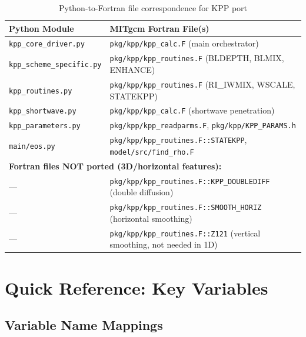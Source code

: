 \documentclass[11pt]{article}
\begin{document}
\begin{table}[h]
\centering
\small
\begin{tabular}{lp{6cm}}
\toprule
\textbf{Python Module} & \textbf{MITgcm Fortran File(s)} \\
\midrule
\verb|kpp_core_driver.py| & \verb|pkg/kpp/kpp_calc.F| (main orchestrator) \\
\verb|kpp_scheme_specific.py| & \verb|pkg/kpp/kpp_routines.F| (BLDEPTH, BLMIX, ENHANCE) \\
\verb|kpp_routines.py| & \verb|pkg/kpp/kpp_routines.F| (RI\_IWMIX, WSCALE, STATEKPP) \\
\verb|kpp_shortwave.py| & \verb|pkg/kpp/kpp_calc.F| (shortwave penetration) \\
\verb|kpp_parameters.py| & \verb|pkg/kpp/kpp_readparms.F|, \verb|pkg/kpp/KPP_PARAMS.h| \\
\verb|main/eos.py| & \verb|pkg/kpp/kpp_routines.F::STATEKPP|, \verb|model/src/find_rho.F| \\
\midrule
\multicolumn{2}{l}{\textbf{Fortran files NOT ported (3D/horizontal features):}} \\
— & \verb|pkg/kpp/kpp_routines.F::KPP_DOUBLEDIFF| (double diffusion) \\
— & \verb|pkg/kpp/kpp_routines.F::SMOOTH_HORIZ| (horizontal smoothing) \\
— & \verb|pkg/kpp/kpp_routines.F::Z121| (vertical smoothing, not needed in 1D) \\
\bottomrule
\end{tabular}
\caption{Python-to-Fortran file correspondence for KPP port}
\end{table}

\section{Quick Reference: Key Variables}
\label{sec:variables}

\subsection{Variable Name Mappings}
\end{document}
